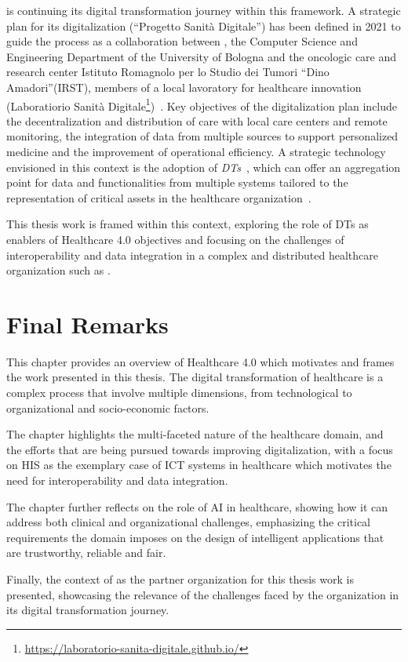\ausl{} is continuing its digital transformation journey within this framework.
%
A strategic plan for its digitalization (``Progetto Sanità Digitale'') has been defined in 2021 to guide the process as a collaboration between \ausl{}, the Computer Science and Engineering Department of the University of Bologna and the oncologic care and research center {Istituto Romagnolo per lo Studio dei Tumori ``Dino Amadori''(IRST)}, members of a local lavoratory for healthcare innovation (Laboratiorio Sanità Digitale\footnote{\url{https://laboratorio-sanita-digitale.github.io/}})~\cite{progetto_sanità_digitale}.
%
Key objectives of the digitalization plan include the decentralization and distribution of care with local care centers and remote monitoring, the integration of data from multiple sources to support personalized medicine and the improvement of operational efficiency. 
%
A strategic technology envisioned in this context is the adoption of \emph{\acp{DT}~\cite{Grieves_2023}}, which can offer an aggregation point for data and functionalities from multiple systems tailored to the representation of critical assets in the healthcare organization~\cite{progetto_sanità_digitale}.

This thesis work is framed within this context, exploring the role of \acp{DT} as enablers of Healthcare 4.0 objectives and focusing on the challenges of interoperability and data integration in a complex and distributed healthcare organization such as \ausl{}.


\section{Final Remarks}

This chapter provides an overview of Healthcare 4.0 which motivates and frames the work presented in this thesis. 
%
The digital transformation of healthcare is a complex process that involve multiple dimensions, from technological to organizational and socio-economic factors.

The chapter highlights the multi-faceted nature of the healthcare domain, and the efforts that are being pursued towards improving digitalization, with a focus on \ac{HIS} as the exemplary case of \ac{ICT} systems in healthcare which motivates the need for interoperability and data integration.

The chapter further reflects on the role of \ac{AI} in healthcare, showing how it can address both clinical and organizational challenges, emphasizing the critical requirements the domain imposes on the design of intelligent applications that are trustworthy, reliable and fair.

Finally, the context of \ausl{} as the partner organization for this thesis work is presented, showcasing the relevance of the challenges faced by the organization in its digital transformation journey.